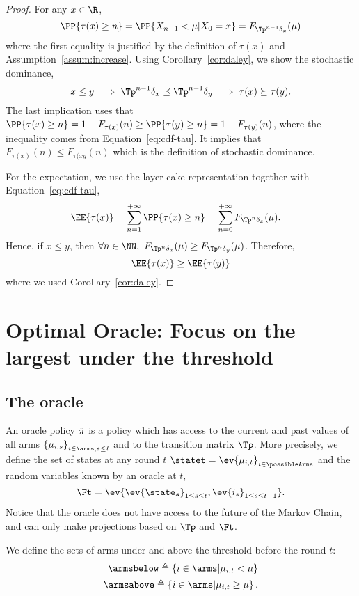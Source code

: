 \begin{proof}
For any $x\in \R$, 
\begin{equation}
\label{eq:cdf-tau}
\PP{\tau(x) \geq n} = \PP{X_{n-1} < \mu| X_0=x} = F_{\Tp^{n-1}\delta_{x}}(\mu)
\end{equation}
where the first equality is justified by the definition of $\tau(x)$ and Assumption~\ref{assum:increase}. Using Corollary~\ref{cor:daley}, we show the stochastic dominance,  
\[
x \leq y \implies \Tp^{n-1}\delta_{x} \preceq \Tp^{n-1}\delta_{y} \implies \tau(x) \succeq \tau(y).
\]
The last implication uses that $\PP{\tau(x) \geq n} = 1-F_{\tau(x)}(n) \geq \PP{\tau(y) \geq n} = 1-F_{\tau(y)}(n)$, where the inequality comes from Equation~\ref{eq:cdf-tau}. It implies that $F_{\tau(x)}(n) \leq F_{\tau(xy}(n)$ which is the definition of stochastic dominance. 

For the expectation, we use the layer-cake representation together with Equation~\ref{eq:cdf-tau}, 
\begin{align*}
\EE{\tau(x)} &=  \sum_{n=1}^{+\infty} \PP{\tau(x) \geq n} = \sum_{n=0}^{+ \infty} F_{\Tp^{n}\delta_{x}}(\mu).
\end{align*}
Hence, if $x \leq y$, then $\forall n \in \NN, \ F_{\Tp^{n}\delta_{x}}(\mu) \geq F_{\Tp^{n}\delta_{y}}(\mu)$. Therefore,
\[
\EE{\tau(x)}\geq \EE{\tau(y)} 
\]
where we used Corollary~\ref{cor:daley}. 
\end{proof}
\section{Optimal Oracle: Focus on the largest under the threshold}
\label{sec:oracle}

\subsection{The {\FLUT} oracle }
An oracle policy $\Tilde{\pi}$ is a policy which has access to the current and past values of all arms $\left\{\mu_{i,s}\right\}_{i \in \arms, s \leq t}$ and to the transition matrix $\Tp$. More precisely, we define the set of states at any round $t$ $\statet = \ev{\mu_{i,t}}_{i \in \possibleArms}$ and the random variables known by an oracle at $t$, 
\[\Ft = \ev{\ev{\state_{\boldsymbol{s}}}_{1 \leq s\leq t}, \ev{i_s}_{1 \leq s \leq t-1}}.\]
 Notice that the oracle does not have access to the future of the Markov Chain, and can only make projections based on $\Tp$ and $\Ft$.

We define the sets of arms under and above the threshold before the round $t$: 
\begin{align*}
\armsbelow \triangleq \left\{i \in \arms | \mu_{i,t} < \mu \right\}\\
\armsabove\triangleq \left\{i \in \arms | \mu_{i,t} \geq \mu \right\}.
\end{align*}

